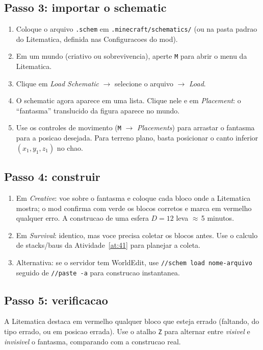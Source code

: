 \documentclass[12pt,a4paper]{scrartcl}
\newcommand{\cmd}[1]{\textcolor{earth}{\texttt{\small #1}}}
\begin{document}
\subsection{Passo 3: importar o schematic}
\begin{enumerate}[leftmargin=1.5em,itemsep=0.15em,topsep=0.3em]
  \item Coloque o arquivo \texttt{.schem} em \texttt{.minecraft/schematics/} (ou na pasta padrao do Litematica, definida nas Configuracoes do mod).
  \item Em um mundo (criativo ou sobrevivencia), aperte \texttt{M} para abrir o menu da Litematica.
  \item Clique em \emph{Load Schematic} $\rightarrow$ selecione o arquivo $\rightarrow$ \emph{Load}.
  \item O schematic agora aparece em uma lista. Clique nele e em \emph{Placement}: o \enquote{fantasma} translucido da figura aparece no mundo.
  \item Use os controles de movimento (\texttt{M} $\rightarrow$ \emph{Placements}) para arrastar o fantasma para a posicao desejada. Para terreno plano, basta posicionar o canto inferior $(x_1, y_1, z_1)$ no chao.
\end{enumerate}

\subsection{Passo 4: construir}
\begin{enumerate}[leftmargin=1.5em,itemsep=0.15em,topsep=0.3em]
  \item Em \emph{Creative}: voe sobre o fantasma e coloque cada bloco onde a Litematica mostra; o mod confirma com verde os blocos corretos e marca em vermelho qualquer erro. A construcao de uma esfera $D = 12$ leva $\approx$\,5 minutos.
  \item Em \emph{Survival}: identico, mas voce precisa coletar os blocos antes. Use o calculo de stacks/baus da Atividade~\ref{at:41} para planejar a coleta.
  \item Alternativa: se o servidor tem WorldEdit, use \cmd{//schem load nome-arquivo} seguido de \cmd{//paste -a} para construcao instantanea.
\end{enumerate}

\subsection{Passo 5: verificacao}
A Litematica destaca em vermelho qualquer bloco que esteja errado (faltando, do tipo errado, ou em posicao errada). Use o atalho \texttt{Z} para alternar entre \emph{visivel} e \emph{invisivel} o fantasma, comparando com a construcao real.
\end{document}
